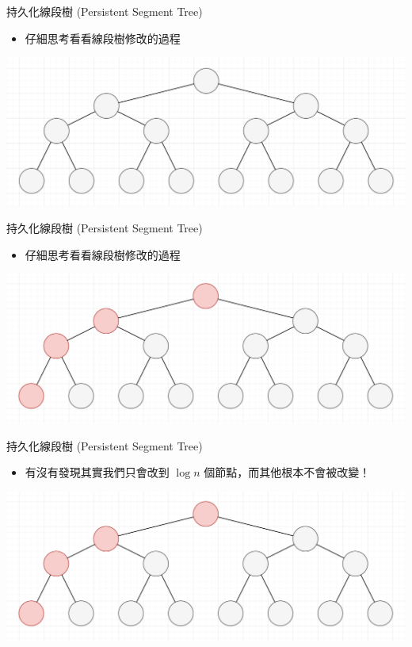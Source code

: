 \documentclass[aspectratio=169]{beamer}
\begin{document}
    \begin{frame}{持久化線段樹 (Persistent Segment Tree)}
        \begin{itemize}
            \item 仔細思考看看線段樹修改的過程
        \end{itemize}
        \begin{center}
            \includegraphics[scale=0.4]{persistent/segment_tree.png}
        \end{center}
    \end{frame}

    \begin{frame}{持久化線段樹 (Persistent Segment Tree)}
        \begin{itemize}
            \item 仔細思考看看線段樹修改的過程
        \end{itemize}
        \begin{center}
            \includegraphics[scale=0.4]{persistent/segment_tree_modify.png}
        \end{center}
    \end{frame}

    \begin{frame}{持久化線段樹 (Persistent Segment Tree)}
        \begin{itemize}
            \item 有沒有發現其實我們只會改到 $\log n$ 個節點，而其他根本不會被改變！
        \end{itemize}
        \begin{center}
            \includegraphics[scale=0.4]{persistent/segment_tree_modify.png}
        \end{center}
    \end{frame}
\end{document}
